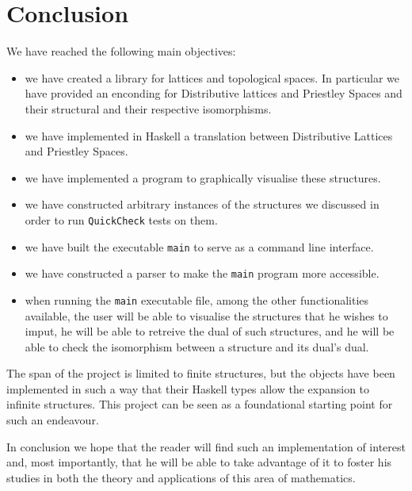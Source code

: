 
\section{Conclusion}\label{sec:Conclusion}

We have reached the following main objectives:

\begin{itemize}


    \item we have created a library for lattices and topological spaces. In particular we have provided an enconding for Distributive lattices and Priestley Spaces and their structural and their respective isomorphisms.  
    \item we have implemented in Haskell a translation between Distributive Lattices and Priestley Spaces. 
    \item we have implemented a program to graphically visualise these structures.  
    \item we have constructed arbitrary instances of the structures we discussed in order to run \texttt{QuickCheck} tests on them.
    \item we have built the executable \texttt{main} to serve as a command line interface.  
    \item we have constructed a parser to make the \texttt{main} program more accessible.   
    \item when running the \texttt{main} executable file, among the other functionalities available, the user will be able to visualise the structures that he wishes to imput, he will be able to retreive the dual of such structures, and he will be able to check the isomorphism between a structure and its dual's dual. 
\end{itemize}

The span of the project is limited to finite structures, but the objects have been implemented in such a way that their Haskell types allow the expansion to infinite structures. This project can be seen as a foundational starting point for such an endeavour. 

In conclusion we hope that the reader will find such an implementation of interest and, most importantly, that he will be able to take advantage of it to foster his studies in both the theory and applications of this area of mathematics. 